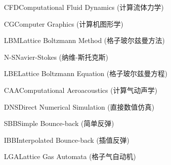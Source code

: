 
\begin{nomenclatures}[缩写]
  \item{CFD}{Computational Fluid Dynamics (计算流体力学)}
  \item{CG}{Computer Graphics (计算机图形学)}
  \item{LBM}{Lattice Boltzmann Method (格子玻尔兹曼方法)}
  \item{N-S}{Navier-Stokes (纳维-斯托克斯)}
  \item{LBE}{Lattice Boltzmann Equation (格子玻尔兹曼方程)}
  \item{CAA}{Computational Aeroacoustics (计算气动声学)}
  \item{DNS}{Direct Numerical Simulation (直接数值仿真)}
  \item{SBB}{Simple Bounce-back (简单反弹)}
  \item{IBB}{Interpolated Bounce-back (插值反弹)}
  \item{LGA}{Lattice Gas Automata (格子气自动机)}
\end{nomenclatures}

